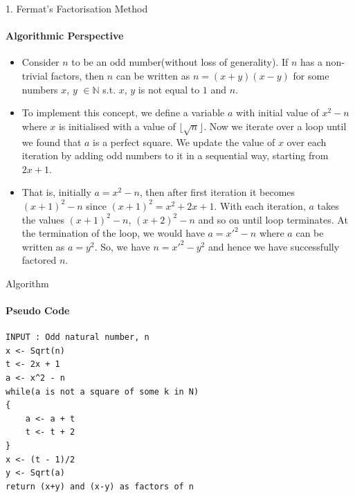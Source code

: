 \documentclass{beamer}
\begin{document}
\begin{frame}{1. Fermat's Factorisation Method}
\framesubtitle{Algorithmic Perspective}
\begin{itemize}
    \item Consider $n$ to be an odd number(without loss of generality). If $n$ has a non-trivial factors, then $n$ can be written as $n = (x+y)(x-y)$ for some numbers $x$, $y$ $\in \mathbb{N}$ s.t. $x$, $y$ is not equal to $1$ and $n$.
    \item To implement this concept, we define a variable $a$ with initial value of $x^{2}-n$ where $x$ is initialised with a value of $\lfloor \sqrt {n}\rfloor $. Now we iterate over a loop until we found that $a$ is a perfect square. We update the value of $x$ over each iteration by adding odd numbers to it in a sequential way, starting from $2x+1$.
    \item That is, initially $a = x^{2}-n$, then after first iteration it becomes $\left( x+1\right) ^{2}-n$ since $\left( x+1\right) ^{2}=x^{2}+2x+1$. With each iteration, $a$ takes the values $\left( x+1\right) ^{2}-n$, $\left( x+2\right) ^{2}-n$ and so on until loop terminates. At the termination of the loop, we would have $a = x'^{2}-n$ where $a$ can be written as $a=y^{2}$. So, we have $n=x'^{2}-y^{2}$ and hence we have successfully factored $n$.
    
\end{itemize}
\end{frame}

\begin{frame}[fragile]{Algorithm}
\framesubtitle{Pseudo Code}
\begin{verbatim}
INPUT : Odd natural number, n
x <- Sqrt(n)
t <- 2x + 1
a <- x^2 - n
while(a is not a square of some k in N)
{
    a <- a + t
    t <- t + 2
}
x <- (t - 1)/2
y <- Sqrt(a)
return (x+y) and (x-y) as factors of n
\end{verbatim}
\end{frame}
\end{document}
